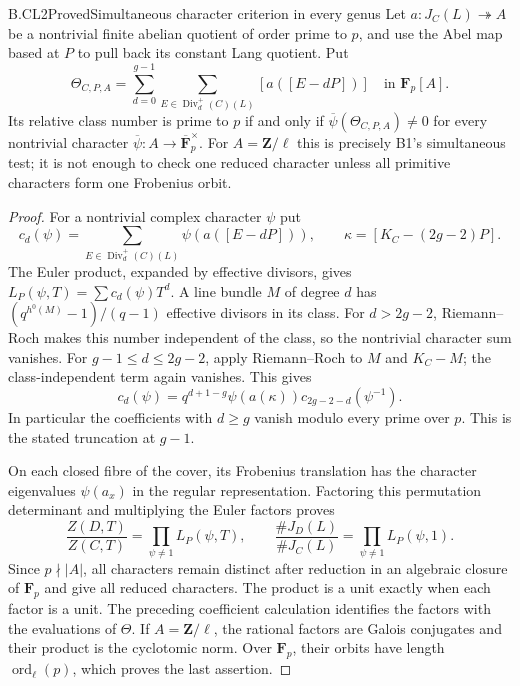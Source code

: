 \begin{claim}{B.CL2}{Proved}{Simultaneous character criterion in every genus}
Let $a:J_C(L)\twoheadrightarrow A$ be a nontrivial finite abelian
quotient of order prime to $p$, and use the Abel map based at $P$
to pull back its constant Lang quotient. Put
\[
 \Theta_{C,P,A}=\sum_{d=0}^{g-1}
       \sum_{E\in\operatorname{Div}^{+}_d(C)(L)}
                    [a([E-dP])]\quad\text{in }\mathbf F_p[A].
\]
Its relative class number is prime to $p$ if and only if
$\overline\psi(\Theta_{C,P,A})\ne0$ for every nontrivial
character $\overline\psi:A\to\overline{\mathbf F}_p^\times$.
For $A=\mathbf Z/\ell$ this is precisely B1's simultaneous
test; it is not enough to check one reduced character unless
all primitive characters form one Frobenius orbit.
\end{claim}
\begin{proof}
For a nontrivial complex character $\psi$ put
\[
 c_d(\psi)=\sum_{E\in\operatorname{Div}^{+}_d(C)(L)}
                 \psi(a([E-dP])),\qquad
 \kappa=[K_C-(2g-2)P].
\]
The Euler product, expanded by effective divisors, gives
$L_P(\psi,T)=\sum c_d(\psi)T^d$. A line bundle $M$ of
degree $d$ has $(q^{h^0(M)}-1)/(q-1)$ effective divisors in
its class. For $d>2g-2$, Riemann--Roch makes this number
independent of the class, so the nontrivial character sum
vanishes. For $g-1\le d\le2g-2$, apply Riemann--Roch to
$M$ and $K_C-M$; the class-independent term again vanishes.
This gives
\[
 c_d(\psi)=q^{d+1-g}\psi(a(\kappa))
                       c_{2g-2-d}(\psi^{-1}).
\]
In particular the coefficients with $d\ge g$ vanish modulo
every prime over $p$. This is the stated truncation at $g-1$.

On each closed fibre of the cover, its Frobenius translation
has the character eigenvalues $\psi(a_x)$ in the regular
representation. Factoring this permutation determinant and
multiplying the Euler factors proves
\[
 \frac{Z(D,T)}{Z(C,T)}=\prod_{\psi\ne1}L_P(\psi,T),
 \qquad
 \frac{\#J_D(L)}{\#J_C(L)}=
                       \prod_{\psi\ne1}L_P(\psi,1).
\]
Since $p\nmid|A|$, all characters remain distinct after
reduction in an algebraic closure of $\mathbf F_p$ and give
all reduced characters. The product is a unit exactly when
each factor is a unit. The preceding coefficient calculation
identifies the factors with the evaluations of $\Theta$.
If $A=\mathbf Z/\ell$, the rational factors are Galois
conjugates and their product is the cyclotomic norm. Over
$\mathbf F_p$, their orbits have length
$\operatorname{ord}_\ell(p)$, which proves the last assertion.
\end{proof}

